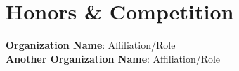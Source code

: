 \section{Honors \& Competition}

 \begin{itemize}[leftmargin=0.15in, label={}]
    {\item{
        \textbf{Organization Name}{: Affiliation/Role} \\
        \textbf{Another Organization Name}{: Affiliation/Role} \\
    }}
 \end{itemize}
